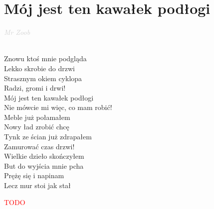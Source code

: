 \documentclass[a5paper, 10pt]{book}
\begin{document}
\section{Mój jest ten kawałek podłogi}\textcolor{lightgray}{\textit{Mr Zoob}}\\~\\
\begin{minipage}[t]{0.8\textwidth}
Znowu ktoś mnie podgląda\\
Lekko skrobie do drzwi\\
Strasznym okiem cyklopa\\
Radzi, gromi i drwi!\\

\hspace*{5mm}Mój jest ten kawałek podłogi\\
\hspace*{5mm}Nie mówcie mi więc, co mam robić!\\

Meble już połamałem\\
Nowy ład zrobić chcę\\
Tynk ze ścian już zdrapałem\\
Zamurować czas drzwi!\\

Wielkie dzieło skończyłem\\
But do wyjścia mnie pcha\\
Prężę się i napinam\\
Lecz mur stoi jak stał\\

\end{minipage}
\begin{minipage}[t]{0.2\textwidth}
\textcolor{red}{TODO}\\
\end{minipage}

\newpage
\end{document}

